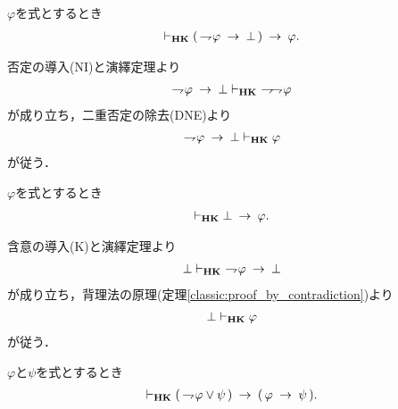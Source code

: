 	\begin{screen}
		\begin{thm}[背理法の原理]
		\label{classic:proof_by_contradiction}
			$\varphi$を式とするとき
			\begin{align}
				\vdash_{{\scriptsize \mbox{{\bf HK}}}} (\, \rightharpoondown\hspace{-0.25em} \varphi \hspace{0.25em}\rightarrow\hspace{0.25em} \bot\, )
				\hspace{0.25em}\rightarrow\hspace{0.25em} \varphi.
			\end{align}
		\end{thm}
	\end{screen}
	
	\begin{sketch}
		否定の導入(NI)と演繹定理より
		\begin{align}
			\negation \varphi \rarrow \bot \provable{\mbox{{\bf HK}}}\ 
			\negation \negation \varphi
		\end{align}
		が成り立ち，二重否定の除去(DNE)より
		\begin{align}
			\rightharpoondown\hspace{-0.25em} \varphi \hspace{0.25em}\rightarrow\hspace{0.25em} \bot \vdash_{{\scriptsize \mbox{{\bf HK}}}} \varphi
		\end{align}
		が従う．
		\QED
	\end{sketch}
	
	\begin{screen}
		\begin{thm}[爆発律]
		\label{classic:principle_of_explosion}
			$\varphi$を式とするとき
			\begin{align}
				\vdash_{{\scriptsize \mbox{{\bf HK}}}} \bot \hspace{0.25em}\rightarrow\hspace{0.25em} \varphi.
			\end{align}
		\end{thm}
	\end{screen}
	
	\begin{sketch}
		含意の導入(K)と演繹定理より
		\begin{align}
			\bot \vdash_{{\scriptsize \mbox{{\bf HK}}}}\ \rightharpoondown\hspace{-0.25em} \varphi \hspace{0.25em}\rightarrow\hspace{0.25em} \bot
		\end{align}
		が成り立ち，背理法の原理(定理\ref{classic:proof_by_contradiction})より
		\begin{align}
			\bot \vdash_{{\scriptsize \mbox{{\bf HK}}}} \varphi
		\end{align}
		が従う．
		\QED
	\end{sketch}
	
	\begin{screen}
		\begin{thm}[否定の論理和は含意で表せる]
		\label{classic:disjunction_of_negation_rewritable_by_implication}
			$\varphi$と$\psi$を式とするとき
			\begin{align}
				\vdash_{{\scriptsize \mbox{{\bf HK}}}} (\, \rightharpoondown\hspace{-0.25em} \varphi \vee \psi\, )
				\hspace{0.25em}\rightarrow\hspace{0.25em} (\, \varphi \hspace{0.25em}\rightarrow\hspace{0.25em} \psi\, ).
			\end{align}
		\end{thm}
	\end{screen}
	
